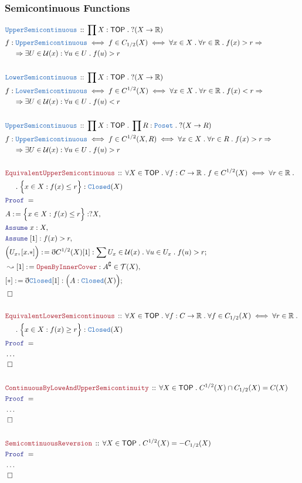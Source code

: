 \documentclass[12pt]{scrartcl}
\newcommand{\TYPE}[1]{\textcolor{NavyBlue}{\mathtt{#1}}}
\newcommand{\LOGIC}[1]{\textcolor{Blue}{\mathtt{#1}}}
\newcommand{\THM}[1]{\textcolor{Maroon}{\mathtt{#1}}}
\renewcommand{\.}{\; . \;}
\newcommand{\de}{: \kern 0.1pc =}
\newcommand{\Theorem}[2]{& \THM{#1} \, :: \, #2 \\ & \Proof = \\ }
\newcommand{\DeclareType}[2]{& \TYPE{#1} \, :: \, #2 \\}
\newcommand{\DefineNamedType}[4]{& #1 : \TYPE{#2} \iff #3 \iff #4 \\}
\newcommand{\NewLine}{\\ & \kern 1pc}
\newcommand{\Page}[1]{ \begin{align*} #1 \end{align*}   }
\newcommand{ \bd }{ \ByDef }
\newcommand{\NoProof}{ & \ldots \\ \EndProof}
\newcommand{\Imply}{\Rightarrow}
\newcommand{\Reals}{\mathbb{R} }
\renewcommand{\c}{\complement}
\newcommand{\Say}[3]{& #1 \de #2 : #3, \\}
\newcommand{\Conclude}[3]{& #1 \de #2 : #3; \\}
\newcommand{\Derive}[3]{& \leadsto #1 \de #2 : #3, \\}
\newcommand{\Assume}[2]{& \LOGIC{Assume} \; #1 : #2, \\}
\newcommand{\QED}{\; \square}
\newcommand{\EndProof}{& \QED \\}
\newcommand{\ByDef}{\eth}
\newcommand{\Proof}{\LOGIC{Proof} \; }
\newcommand{\TOP}{\mathsf{TOP}}
\newcommand{\T}{\mathcal{T}}
\renewcommand{\U}{\mathcal{U}}
\begin{document}
\subsubsection{Semicontinuous Functions}
\Page{
	\DeclareType{UpperSemicontinuous}
	{
		\prod X : \TOP \. ?(X \to \Reals)
	}
	\DefineNamedType{f}{UpperSemicontinuous}{f \in C_{1/2}(X) }
	{
		\forall x \in X \. \forall r \in \Reals \. 
		f(x) > r  \Imply \NewLine \Imply \exists U \in \U(x) : \forall u \in U \. f(u) > r
	}
	\\
	\DeclareType{LowerSemicontinuous}
	{
		\prod X : \TOP \. ?(X \to \Reals)
	}
	\DefineNamedType{f}{LowerSemicontinuous}{f \in C^{1/2}(X) }
	{
		\forall x \in X \. \forall r \in \Reals \. 
		f(x) < r  \Imply \NewLine \Imply \exists U \in \U(x) : \forall u \in U \. f(u) < r
	}
	\\
	\DeclareType{UpperSemicontinuous}
	{
		\prod X : \TOP \. \prod R : \TYPE{Poset} \.  ?(X \to R)
	}
	\DefineNamedType{f}{UpperSemicontinuous}{f \in C^{1/2}(X,R) }
	{
		\forall x \in X \. \forall r \in R \. 
		f(x) > r  \Imply \NewLine \Imply \exists U \in \U(x) : \forall u \in U \. f(u) > r
	}
	\\
	\Theorem{EquivalentUpperSemicontinuous}
	{
		\forall X \in \TOP \. \forall f : C \to \Reals \.
		 f \in C^{1/2}(X) \iff
		\forall r \in \Reals  \. \NewLine \. 
		\Big\{ x \in X :  f(x) \le r \Big\} : \TYPE{Closed}(X)
	}
	\Say{A}{\Big\{ x \in X : f(x) \le r \Big\}}{?X}
	\Assume{x}{ X  }
	\Assume{[1]}{f(x) > r}
	\Conclude{\Big( U_x,[x.*]\Big)}{\bd C^{1/2}(X)[1]}{\sum U_x \in \U(x) \. \forall u \in U_x \. f(u) > r}
	\Derive{[1]}{\THM{OpenByInnerCover}}{A^\c \in \T(X)}
	\Conclude{[*]}{\bd \TYPE{Closed}[1]}{\Big( A : \TYPE{Closed}(X) \Big)}
	\EndProof
	\\
	\Theorem{EquivalentLowerSemicontinuous}
	{
		\forall X \in \TOP \. \forall f : C \to \Reals \.
		\forall f \in C_{1/2}(X) \iff
		\forall r \in \Reals  \. \NewLine \. 
		\Big\{ x \in X :  f(x) \ge r \Big\} : \TYPE{Closed}(X)
	}
	\NoProof
	\\
	\Theorem{ContinuousByLoweAndUpperSemicontinuity}
	{
		\forall X \in \TOP \.
		 C^{1/2}(X) \cap  C_{1/2}(X) = C(X)
	}
	\NoProof
	\\
	\Theorem{SemicomtinuousReversion}
	{
		\forall X \in \TOP \.
		C^{1/2}(X) = - C_{1/2}(X)
	}
	\NoProof
}
\end{document}
